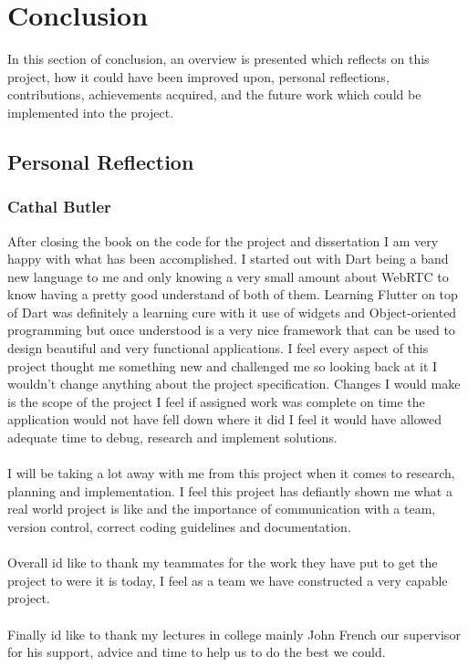\chapter{Conclusion}
In this section of conclusion, an overview is presented which reflects on this project, how it could have been improved upon, personal reflections, contributions, achievements acquired, and the future work which could be implemented into the project.

\section{Personal Reflection}
\subsection{Cathal Butler}
After closing the book on the code for the project and dissertation I am very happy with what has been accomplished. I started out with Dart being a band new language to me and only knowing a very small amount about WebRTC to know having a pretty good understand of both of them. Learning Flutter on top of Dart was definitely a learning cure with it use of widgets and Object-oriented programming but once understood is a very nice framework that can be used to design beautiful and very functional applications. I feel every aspect of this project thought me something new and challenged me so looking back at it I wouldn't change anything about the project specification. Changes I would make is the scope of the project I feel if assigned work was complete on time the application would not have fell down where it did I feel it would have allowed adequate time to debug, research and implement solutions.
\\\\ I will be taking a lot away with me from this project when it comes to research, planning and implementation. I feel this project has defiantly shown me what a real world project is like and the importance of communication with a team, version control, correct coding guidelines and documentation.
\\\\ Overall id like to thank my teammates for the work they have put to get the project to were it is today, I feel as a team we have constructed a very capable project. 
\\\\ Finally id like to thank my lectures in college mainly John French our supervisor for his support, advice and time to help us to do the best we could.    



